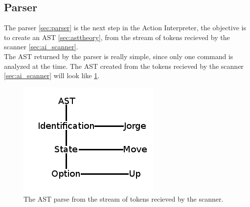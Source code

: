 \subsection{Parser}
The parser \ref{sec:parser} is the next step in the Action Interpreter, the objective is to create an AST \ref{sec:asttheory}, from the stream of tokens recieved by the scanner \ref{sec:ai_scanner}.\\
The AST returned by the parser is really simple, since only one command is analyzed at the time. The AST created from the tokens recieved by the scanner \ref{sec:ai_scanner} will look like \ref{pic:ai_parser_ast}.

\begin{figure}[H]
\begin{center}
\includegraphics[scale=0.5]{Images/actioninterpreter/AST.png}
\end{center}
\caption{The AST parse from the stream of tokens recieved by the scanner.}
\label{pic:ai_parser_ast}
\end{figure}